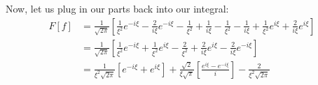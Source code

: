 \begin{enumerate}
Now, let us plug in our parts back into our integral:
%
\begin{align}
  F[f]
  & =
  \frac{1}{\sqrt{2 \pi}}
  \left[
      \frac{1}{ \xi^2} e^{-i \xi}
      - \frac{2}{ i \xi} e^{-i \xi}
      - \frac{1}{ \xi^2}
      + \frac{1}{ i \xi}
%
      - \frac{1}{ \xi^2}
      - \frac{1}{ i \xi}
      + \frac{1}{ \xi^2} e^{i \xi}
      + \frac{2}{ i \xi} e^{i \xi}
  \right]\\
  & =
  \frac{1}{\sqrt{2 \pi}}
  \left[
        \frac{1}{ \xi^2} e^{-i \xi}
      + \frac{1}{ \xi^2} e^{i \xi}
      - \frac{2}{ \xi^2}
      + \frac{2}{ i \xi} e^{i \xi}
      - \frac{2}{ i \xi} e^{-i \xi}
  \right]\\
  & =
  \frac{1}{\xi^2 \sqrt{2 \pi}}
  \left[
      e^{-i \xi}
    + e^{i \xi}
  \right]
  +
  \frac{\sqrt 2}{\xi \sqrt \pi}
  \left[
      \frac{e^{i \xi} - e^{-i \xi}}{i}
  \right]
  - \frac{2}{\xi^2 \sqrt{2 \pi}}
\end{align}
\end{enumerate}
